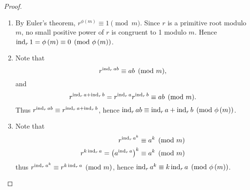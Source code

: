 \begin{proof}
    \begin{enumerate}
        \item By Euler's theorem, $r^{\phi\left(m\right)}\equiv 1 \pmod{m}$.
        Since $r$ is a primitive root modulo $m$, no small positive power of $r$ is
        congruent to 1 modulo $m$.
        Hence $\operatorname{\mathrm{ind}}_r 1 = \phi\left(m\right) \equiv 0 \pmod{\phi\left(m\right)}$.
        \item Note that
        \[
            r^{\operatorname{\mathrm{ind}}_r ab} \equiv ab \pmod{m},
        \] and \[
            r^{\operatorname{\mathrm{ind}}_r a + \operatorname{\mathrm{ind}}_r b} = r^{\operatorname{\mathrm{ind}}_r a}r^{\operatorname{\mathrm{ind}}_r b} \equiv ab \pmod{m}.
        \]
        Thus $r^{\operatorname{\mathrm{ind}}_r ab} \equiv r^{\operatorname{\mathrm{ind}}_r a + \operatorname{\mathrm{ind}}_r b}$,
        hence $\operatorname{\mathrm{ind}}_r ab \equiv \operatorname{\mathrm{ind}}_r a + \operatorname{\mathrm{ind}}_r b \pmod{\phi\left(m\right)}$.
        \item Note that
        \begin{align*}
            r^{\operatorname{\mathrm{ind}}_r a^k} &\equiv a^k \pmod{m} \\
            r^{k \operatorname{\mathrm{ind}}_r a} = \left(a^{\operatorname{\mathrm{ind}}_r a}\right)^k &\equiv a^k \pmod{m}
        \end{align*}
        thus $r^{\operatorname{\mathrm{ind}}_r a^k} \equiv r^{k \operatorname{\mathrm{ind}}_r a} \pmod{m}$, hence
        $\operatorname{\mathrm{ind}}_r a^k \equiv k \operatorname{\mathrm{ind}}_r a \pmod{\phi\left(m\right)}$.
    \end{enumerate}
\end{proof}

